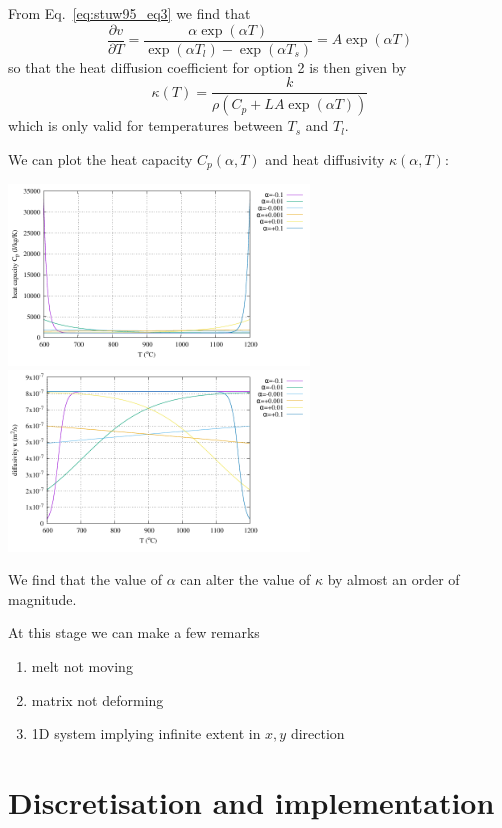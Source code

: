 From Eq.~\eqref{eq:stuw95_eq3} we find that
\[
\frac{\partial v}{\partial T}  
= \frac{\alpha \exp (\alpha T) }{\exp(\alpha T_l) - \exp(\alpha T_s) } 
=A \exp (\alpha T)
\]
so that the heat diffusion coefficient for option 2 is then given by
\[
\kappa(T) = \frac{k}{\rho \left(C_p + L A \exp(\alpha T) \right)}
\]
which is only valid for temperatures between $T_s$ and $T_l$.

We can plot the heat capacity $C_p(\alpha,T)$ and heat diffusivity $\kappa(\alpha,T)$:
\begin{center}
\includegraphics[width=8cm]{python_codes/fieldstone_169/images/hcapa.pdf}
\includegraphics[width=8cm]{python_codes/fieldstone_169/images/kappa.pdf}
\end{center}
We find that the value of $\alpha$ can alter the value of $\kappa$ by almost 
an order of magnitude.

At this stage we can make a few remarks
\begin{enumerate}
\item melt not moving
\item matrix not deforming
\item 1D system implying infinite extent in $x,y$ direction
\end{enumerate}


\section*{Discretisation and implementation}

